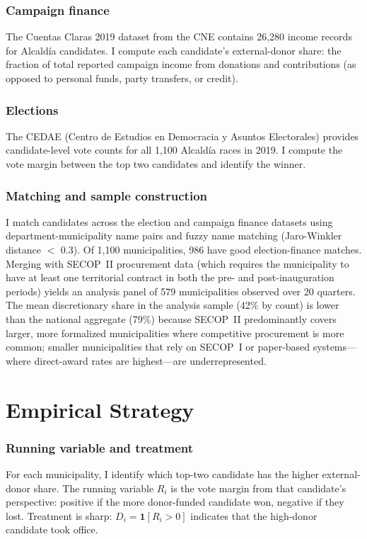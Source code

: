 \documentclass[12pt]{article}
\begin{document}
\subsubsection*{Campaign finance} The Cuentas Claras 2019 dataset from the CNE contains 26,280 income records for Alcald\'{i}a candidates. I compute each candidate's external-donor share: the fraction of total reported campaign income from donations and contributions (as opposed to personal funds, party transfers, or credit).

\subsubsection*{Elections} The CEDAE (Centro de Estudios en Democracia y Asuntos Electorales) provides candidate-level vote counts for all 1,100 Alcald\'{i}a races in 2019. I compute the vote margin between the top two candidates and identify the winner.

\subsubsection*{Matching and sample construction} I match candidates across the election and campaign finance datasets using department-municipality name pairs and fuzzy name matching (Jaro-Winkler distance $<$ 0.3). Of 1,100 municipalities, 986 have good election-finance matches. Merging with SECOP~II procurement data (which requires the municipality to have at least one territorial contract in both the pre- and post-inauguration periods) yields an analysis panel of 579 municipalities observed over 20 quarters. The mean discretionary share in the analysis sample (42\% by count) is lower than the national aggregate (79\%) because SECOP~II predominantly covers larger, more formalized municipalities where competitive procurement is more common; smaller municipalities that rely on SECOP~I or paper-based systems---where direct-award rates are highest---are underrepresented.




\section{Empirical Strategy}
\label{sec:strategy}

\subsubsection*{Running variable and treatment} For each municipality, I identify which top-two candidate has the higher external-donor share. The running variable $R_i$ is the vote margin from that candidate's perspective: positive if the more donor-funded candidate won, negative if they lost. Treatment is sharp: $D_i = \mathbf{1}[R_i > 0]$ indicates that the high-donor candidate took office.
\end{document}
